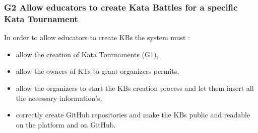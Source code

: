 \documentclass[11pt]{report}
\begin{document}
\subsubsection{G2 Allow educators to create Kata Battles for a specific Kata Tournament}
In order to allow educators to create KBs the system must :
\begin{itemize}
    \item allow the creation of Kata Tournaments (G1),
    \item allow the owners of KTs to grant organizers permits,
    \item allow the organizers to start the KBs creation process and let them insert all the necessary information's,
    \item correctly create GitHub repositories and make the KBs public and readable on the platform and on GitHub.
\end{itemize}
\end{document}
